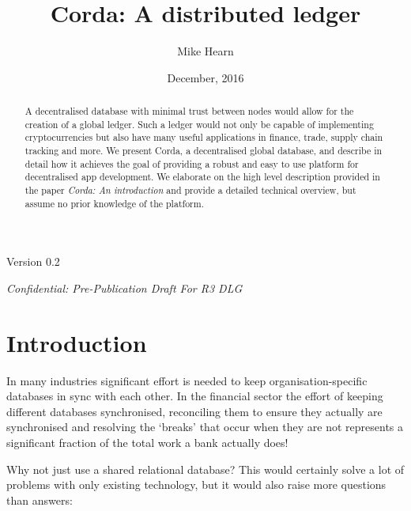 \documentclass{article}
\author{Mike Hearn}
\date{December, 2016}
\title{Corda: A distributed ledger}
\begin{document}
\maketitle

\begin{center}
Version 0.2

\emph{Confidential: Pre-Publication Draft For R3 DLG}
\end{center}

\vspace{10mm}

\begin{abstract}

A decentralised database with minimal trust between nodes would allow for the creation of a global ledger. Such a ledger
would not only be capable of implementing cryptocurrencies but also have many useful applications in finance, trade,
supply chain tracking and more. We present Corda, a decentralised global database, and describe in detail how it
achieves the goal of providing a robust and easy to use platform for decentralised app development. We elaborate on the
high level description provided in the paper \emph{Corda: An introduction}\cite{CordaIntro} and provide a detailed
technical overview, but assume no prior knowledge of the platform.

\end{abstract}
\newpage
\tableofcontents
\newpage
\section{Introduction}

In many industries significant effort is needed to keep organisation-specific databases in sync with each
other. In the financial sector the effort of keeping different databases synchronised, reconciling them to ensure
they actually are synchronised and resolving the `breaks' that occur when they are not represents a significant
fraction of the total work a bank actually does!

Why not just use a shared relational database? This would certainly solve a lot of problems with only existing technology,
but it would also raise more questions than answers:
\end{document}
